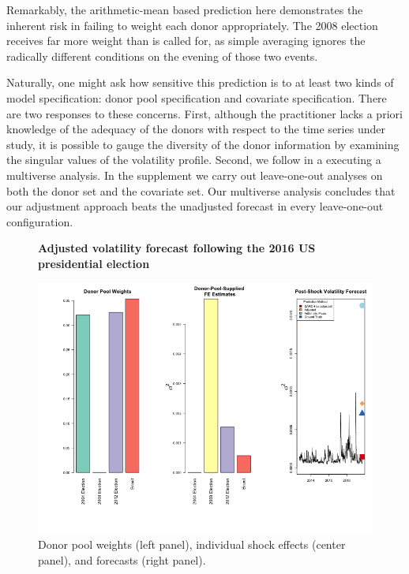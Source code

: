 \documentclass[11pt,3p,review,authoryear]{elsarticle}
\theoremstyle{definition}
\begin{document}
Remarkably, the arithmetic-mean based prediction here demonstrates the inherent risk in failing to weight each donor appropriately.  The 2008 election receives far more weight than is called for, as simple averaging ignores the radically different conditions on the evening of those two events.  

Naturally, one might ask how sensitive this prediction is to at least two kinds of model specification: donor pool specification and covariate specification.  There are two responses to these concerns.  First, although the practitioner lacks a priori knowledge of the adequacy of the donors with respect to the time series under study, it is possible to gauge the diversity of the donor information by examining the singular values of the volatility profile.  %
Second, we follow \citet{steegen2016increasing} in a executing a multiverse analysis.  In the supplement we carry out leave-one-out analyses on both the donor set and the covariate set.  Our multiverse analysis concludes that our adjustment approach beats the unadjusted forecast in every leave-one-out configuration. %


\begin{figure}[H]
  \begin{center}
    \textbf{Adjusted volatility forecast following the 2016 US presidential election}\par\medskip
    \includegraphics[scale=.6]{real_data_output_plots/FriMay311830182024_IYG_None_None.png}
    \caption{Donor pool weights (left panel), individual shock effects (center panel), and forecasts (right panel).}
    \label{fig:SVF_2016_with_Brexit}
    \end{center}
  \end{figure}
\end{document}
